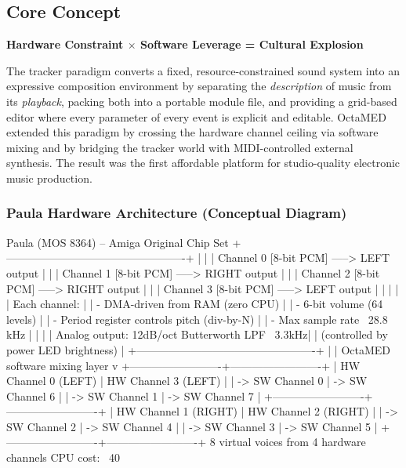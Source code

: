 \documentclass[11pt,letterpaper]{article}
\begin{document}
\subsection{Core Concept}

\begin{center}
{\large\bfseries\sffamily\textcolor{primary}{Hardware Constraint $\times$ Software Leverage = Cultural Explosion}}
\end{center}

The tracker paradigm converts a fixed, resource-constrained sound system into an expressive composition environment by separating the \textit{description} of music from its \textit{playback}, packing both into a portable module file, and providing a grid-based editor where every parameter of every event is explicit and editable. OctaMED extended this paradigm by crossing the hardware channel ceiling via software mixing and by bridging the tracker world with MIDI-controlled external synthesis. The result was the first affordable platform for studio-quality electronic music production.

\subsubsection{Paula Hardware Architecture (Conceptual Diagram)}

\begin{asciibox}
Paula (MOS 8364) -- Amiga Original Chip Set
+-------------------------------------------------+
|                                                 |
|  Channel 0 [8-bit PCM] -----> LEFT output  |   |
|  Channel 1 [8-bit PCM] -----> RIGHT output |   |
|  Channel 2 [8-bit PCM] -----> RIGHT output |   |
|  Channel 3 [8-bit PCM] -----> LEFT output  |   |
|                                                 |
|  Each channel:                                  |
|    - DMA-driven from RAM (zero CPU)             |
|    - 6-bit volume (64 levels)                   |
|    - Period register controls pitch (div-by-N)  |
|    - Max sample rate ~28.8 kHz                  |
|                                                 |
|  Analog output: 12dB/oct Butterworth LPF ~3.3kHz|
|  (controlled by power LED brightness)           |
+-------------------------------------------------+
           |
           | OctaMED software mixing layer
           v
+-------------------------+-------------------------+
| HW Channel 0 (LEFT)     | HW Channel 3 (LEFT)     |
|  -> SW Channel 0        |  -> SW Channel 6        |
|  -> SW Channel 1        |  -> SW Channel 7        |
+-------------------------+-------------------------+
| HW Channel 1 (RIGHT)    | HW Channel 2 (RIGHT)    |
|  -> SW Channel 2        |  -> SW Channel 4        |
|  -> SW Channel 3        |  -> SW Channel 5        |
+-------------------------+-------------------------+
  8 virtual voices from 4 hardware channels
  CPU cost: ~40%
\end{asciibox}
\end{document}
